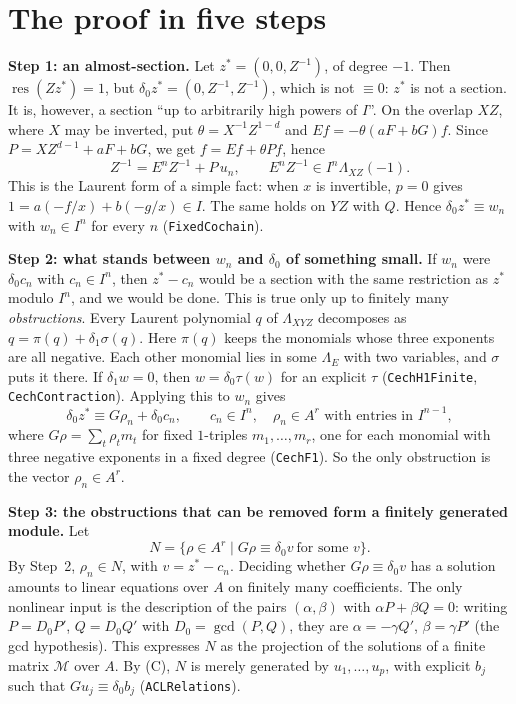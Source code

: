 \documentclass[11pt]{amsart}
\theoremstyle{definition}
\theoremstyle{remark}
\DeclareMathOperator{\res}{res}
\newcommand{\La}{\Lambda}
\begin{document}
\section{The proof in five steps}

\textbf{Step 1: an almost-section.} Let $z^*=(0,0,Z^{-1})$, of degree
$-1$. Then $\res(Zz^*)=1$, but $\delta_0z^*=(0,Z^{-1},Z^{-1})$, which is not
$\equiv0$: $z^*$ is not a section. It is, however, a section ``up to
arbitrarily high powers of $I$''. On the overlap $XZ$, where $X$ may be
inverted, put $\theta=X^{-1}Z^{1-d}$ and $Ef=-\theta(aF+bG)f$. Since
$P=XZ^{d-1}+aF+bG$, we get $f=Ef+\theta Pf$, hence
\[
 Z^{-1}=E^nZ^{-1}+P\,u_n,\qquad E^nZ^{-1}\in I^n\La_{XZ}(-1).
\]
This is the Laurent form of a simple fact: when $x$ is invertible,
$p=0$ gives $1=a(-f/x)+b(-g/x)\in I$. The same holds on $YZ$ with $Q$.
Hence $\delta_0z^*\equiv w_n$ with $w_n\in I^n$ for every $n$
(\texttt{FixedCochain}).

\textbf{Step 2: what stands between $w_n$ and $\delta_0$ of something
small.} If $w_n$ were $\delta_0c_n$ with $c_n\in I^n$, then $z^*-c_n$
would be a section with the same restriction as $z^*$ modulo $I^n$, and
we would be done. This is true only up to finitely many
\emph{obstructions}. Every Laurent polynomial $q$ of $\La_{XYZ}$
decomposes as $q=\pi(q)+\delta_1\sigma(q)$. Here $\pi(q)$ keeps the
monomials whose three exponents are all negative. Each other monomial
lies in some $\La_E$ with two variables, and $\sigma$ puts it there. If
$\delta_1w=0$, then $w=\delta_0\tau(w)$ for an explicit $\tau$
(\texttt{CechH1Finite}, \texttt{CechContraction}). Applying this to
$w_n$ gives
\[
 \delta_0z^*\equiv G\rho_n+\delta_0c_n,\qquad c_n\in I^n,\quad
 \rho_n\in A^r\text{ with entries in }I^{n-1},
\]
where $G\rho=\sum_t\rho_tm_t$ for fixed $1$-triples $m_1,\dots,m_r$, one
for each monomial with three negative exponents in a fixed degree
(\texttt{CechF1}). So the only obstruction is the vector
$\rho_n\in A^r$.

\textbf{Step 3: the obstructions that can be removed form a finitely
generated module.} Let
\[
 N=\{\rho\in A^r\mid G\rho\equiv\delta_0v\ \text{for some }v\}.
\]
By Step~2, $\rho_n\in N$, with $v=z^*-c_n$. Deciding whether
$G\rho\equiv\delta_0v$ has a solution amounts to linear equations over $A$
on finitely many coefficients. The only nonlinear input is the
description of the pairs $(\alpha,\beta)$ with $\alpha P+\beta Q=0$:
writing $P=D_0P'$, $Q=D_0Q'$ with $D_0=\gcd(P,Q)$, they are
$\alpha=-\gamma Q'$, $\beta=\gamma P'$ (the gcd hypothesis). This
expresses $N$ as the projection of the solutions of a finite matrix
$\mathcal M$ over $A$. By (C), $N$ is merely generated by
$u_1,\dots,u_p$, with explicit $b_j$ such that $Gu_j\equiv\delta_0b_j$
(\texttt{ACLRelations}).
\end{document}
